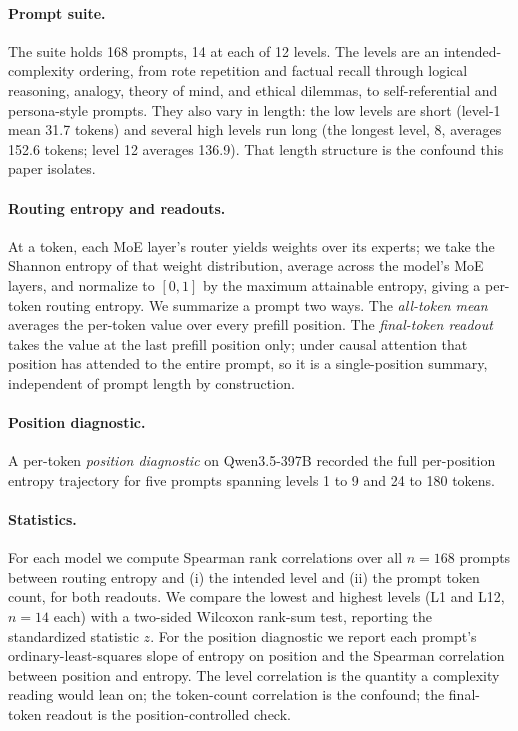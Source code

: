 \documentclass[10pt,twocolumn]{article}
\begin{document}
\paragraph{Prompt suite.}
The suite holds 168 prompts, 14 at each of 12 levels. The levels are an
intended-complexity ordering, from rote repetition and factual recall
through logical reasoning, analogy, theory of mind, and ethical dilemmas, to
self-referential and persona-style prompts. They also vary in length: the
low levels are short (level-1 mean 31.7 tokens) and several high levels run
long (the longest level, 8, averages 152.6 tokens; level 12 averages 136.9).
That length structure is the confound this paper isolates.

\paragraph{Routing entropy and readouts.}
At a token, each MoE layer's router yields weights over its experts; we take
the Shannon entropy of that weight distribution, average across the model's
MoE layers, and normalize to $[0,1]$ by the maximum attainable entropy,
giving a per-token routing entropy. We summarize a prompt two ways. The
\emph{all-token mean} averages the per-token value over every prefill
position. The \emph{final-token readout} takes the value at the last prefill
position only; under causal attention that position has attended to the
entire prompt, so it is a single-position summary, independent of prompt
length by construction.

\paragraph{Position diagnostic.}
A per-token \emph{position diagnostic} on Qwen3.5-397B recorded the full
per-position entropy trajectory for five prompts spanning levels 1 to 9 and
24 to 180 tokens.

\paragraph{Statistics.}
For each model we compute Spearman rank correlations over all $n=168$
prompts between routing entropy and (i) the intended level and (ii) the
prompt token count, for both readouts. We compare the lowest and highest
levels (L1 and L12, $n=14$ each) with a two-sided Wilcoxon rank-sum test,
reporting the standardized statistic $z$. For the position diagnostic we
report each prompt's ordinary-least-squares slope of entropy on position and
the Spearman correlation between position and entropy. The level correlation
is the quantity a complexity reading would lean on; the token-count
correlation is the confound; the final-token readout is the
position-controlled check.
\end{document}
